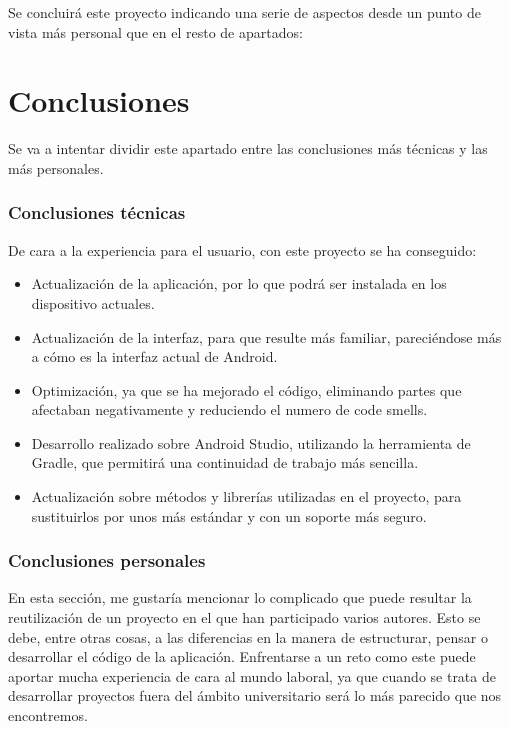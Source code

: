 Se concluirá este proyecto indicando una serie de aspectos desde un punto de vista más personal que en el resto de apartados:

\section{Conclusiones}

Se va a intentar dividir este apartado entre las conclusiones más técnicas y las más personales.

\subsubsection{Conclusiones técnicas}

De cara a la experiencia para el usuario, con este proyecto se ha conseguido:

\begin{itemize}
\item Actualización de la aplicación, por lo que podrá ser instalada en los dispositivo actuales.
\item Actualización de la interfaz, para que resulte más familiar, pareciéndose más a cómo es la interfaz actual de Android.
\item Optimización, ya que se ha mejorado el código, eliminando partes que afectaban negativamente y reduciendo el numero de code smells.
\item Desarrollo realizado sobre Android Studio, utilizando la herramienta de Gradle, que permitirá una continuidad de trabajo más sencilla.
\item Actualización sobre métodos y librerías utilizadas en el proyecto, para sustituirlos por unos más estándar y con un soporte más seguro.
\end{itemize}

\subsubsection{Conclusiones personales}

En esta sección, me gustaría mencionar lo complicado que puede resultar la reutilización de un proyecto en el que han participado varios autores. Esto se debe, entre otras cosas, a las diferencias en la manera de estructurar, pensar o desarrollar el código de la aplicación. Enfrentarse a un reto como este puede aportar mucha experiencia de cara al mundo laboral, ya que cuando se trata de desarrollar proyectos fuera del ámbito universitario será lo más parecido que nos encontremos.

